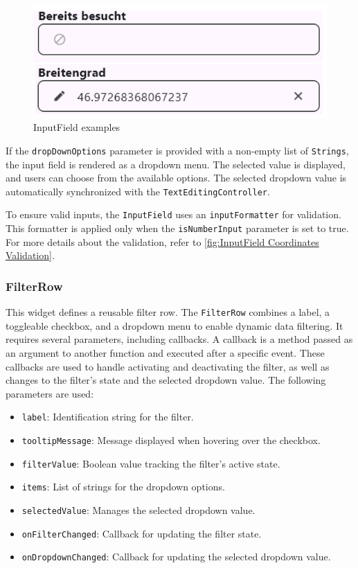 \begin{figure}[H]
    \centering
    \includegraphics[width=0.4\linewidth]{images/AdminPanel/InputFieldExamples.png}
    \caption{InputField examples}
\end{figure}

If the \texttt{dropDownOptions} parameter is provided with a non-empty list of \texttt{Strings}, the input field is rendered as a dropdown menu. The selected value is displayed, and users can choose from the available options. The selected dropdown value is automatically synchronized with the \texttt{TextEditingController}.

To ensure valid inputs, the \texttt{InputField} uses an \texttt{inputFormatter} for validation. This formatter is applied only when the \texttt{isNumberInput} parameter is set to true. For more details about the validation, refer to \ref{fig:InputField Coordinates Validation}.


\subsubsection{FilterRow}
\label{fig:FilterRow}

This widget defines a reusable filter row. The \texttt{FilterRow} combines a label, a toggleable checkbox, and a dropdown menu to enable dynamic data filtering. It requires several parameters, including callbacks. A callback is a method passed as an argument to another function and executed after a specific event. These callbacks are used to handle activating and deactivating the filter, as well as changes to the filter's state and the selected dropdown value. The following parameters are used:

\begin{itemize}
    \item \texttt{label}: Identification string for the filter.
    \item \texttt{tooltipMessage}: Message displayed when hovering over the checkbox.
    \item \texttt{filterValue}: Boolean value tracking the filter's active state.
    \item \texttt{items}: List of strings for the dropdown options.
    \item \texttt{selectedValue}: Manages the selected dropdown value.
    \item \texttt{onFilterChanged}: Callback for updating the filter state.
    \item \texttt{onDropdownChanged}: Callback for updating the selected dropdown value.
\end{itemize}

